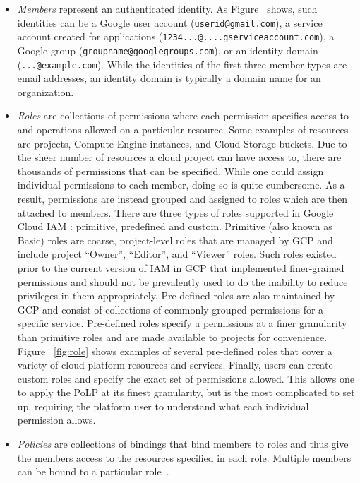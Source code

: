 \begin{itemize}
\item {\em Members} represent an authenticated identity.  As Figure~ shows, such identities can be a Google user account
({\tt userid@gmail.com}), a service account created for applications ({\tt 1234...@....gserviceaccount.com}), a Google group ({\tt groupname@googlegroups.com}), or an identity domain ({\tt ...@example.com}). While the identities of the first three member types are email 
addresses, an identity domain is typically a domain name for an organization.

\item {\em Roles} are collections of permissions where each permission specifies access to and operations allowed on a particular resource.
Some examples of resources are projects, Compute Engine instances, and Cloud Storage buckets.  Due to the sheer number of 
resources a cloud project can have access to, there are thousands of permissions that can be specified.  While one could assign individual
permissions to each member, doing so is quite cumbersome.  As a result, permissions are instead grouped and assigned to roles which are
then attached to members.  There are three types of roles supported in Google Cloud IAM \cite{googlecloudrole}: primitive, predefined and custom.
Primitive (also known as Basic) roles are coarse, project-level roles that are managed by GCP and include project ``Owner'', ``Editor'', and 
``Viewer'' roles.  Such roles existed prior to the current version of IAM in GCP that implemented finer-grained permissions and should not
be prevalently used to do the inability to reduce privileges in them appropriately.  Pre-defined roles are also maintained by GCP and
consist of collections of commonly grouped permissions for a specific service.  Pre-defined roles specify a permissions at a finer granularity 
than primitive roles and are made available to projects for convenience.  Figure ~\ref{fig:role} shows examples of several pre-defined roles that cover a variety of cloud platform resources and services.   Finally, users can create custom roles and specify the exact set of permissions
allowed.  This allows one to apply the PoLP at its finest granularity, but is the most complicated to set up, requiring the platform user to understand what each individual permission allows.

\item {\em Policies} are collections of bindings that bind members to roles and thus give the members access to the resources specified in
each role.  Multiple members can be bound to a particular role~\cite{Googlecloudiam}. 
\end{itemize}

